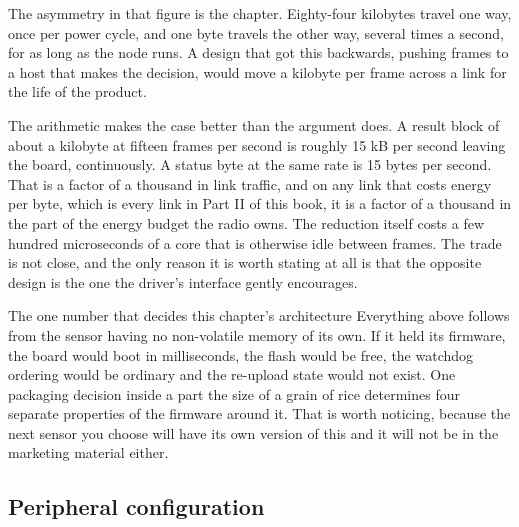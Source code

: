 The asymmetry in that figure is the chapter. Eighty-four kilobytes travel one
way, once per power cycle, and one byte travels the other way, several times a
second, for as long as the node runs. A design that got this backwards, pushing
frames to a host that makes the decision, would move a kilobyte per frame across
a link for the life of the product.

The arithmetic makes the case better than the argument does. A result block of
about a kilobyte at fifteen frames per second is roughly 15 kB per second
leaving the board, continuously. A status byte at the same rate is 15 bytes per
second. That is a factor of a thousand in link traffic, and on any link that
costs energy per byte, which is every link in Part II of this book, it is a
factor of a thousand in the part of the energy budget the radio owns. The
reduction itself costs a few hundred microseconds of a core that is otherwise
idle between frames. The trade is not close, and the only reason it is worth
stating at all is that the opposite design is the one the driver's interface
gently encourages.

\begin{note}{The one number that decides this chapter's architecture}
Everything above follows from the sensor having no non-volatile memory of its
own. If it held its firmware, the board would boot in milliseconds, the flash
would be free, the watchdog ordering would be ordinary and the re-upload state
would not exist. One packaging decision inside a part the size of a grain of
rice determines four separate properties of the firmware around it. That is
worth noticing, because the next sensor you choose will have its own version of
this and it will not be in the marketing material either.
\end{note}

\subsection*{Peripheral configuration}


